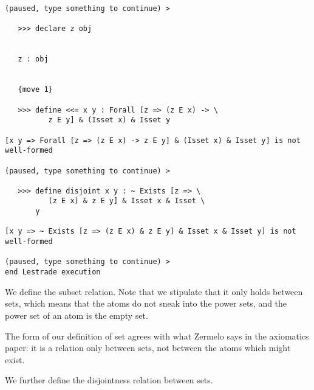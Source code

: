\documentclass[12pt]{article}
\begin{document}
\begin{verbatim}
(paused, type something to continue) >

   >>> declare z obj


   z : obj


   {move 1}

   >>> define <<= x y : Forall [z => (z E x) -> \
          z E y] & (Isset x) & Isset y

[x y => Forall [z => (z E x) -> z E y] & (Isset x) & Isset y] is not well-formed

(paused, type something to continue) >

   >>> define disjoint x y : ~ Exists [z => \
          (z E x) & z E y] & Isset x & Isset \
       y

[x y => ~ Exists [z => (z E x) & z E y] & Isset x & Isset y] is not well-formed

(paused, type something to continue) >
end Lestrade execution
\end{verbatim}

We define the subset relation.  Note that we stipulate that it only holds between sets, which means that the atoms do not sneak into the power sets,
and the power set of an atom is the empty set.

The form of our definition of set agrees with what Zermelo says in the axiomatics paper:  it is a relation only between sets, not between the atoms which might exist. 

We further define the disjointness relation between sets.
\end{document}
